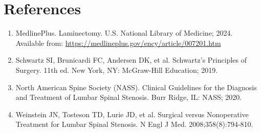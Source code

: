 \section*{References}
\begin{enumerate}
  \item MedlinePlus. Laminectomy. U.S. National Library of Medicine; 2024. Available from: \url{https://medlineplus.gov/ency/article/007201.htm}
  \item Schwartz SI, Brunicardi FC, Andersen DK, et al. Schwartz's Principles of Surgery. 11th ed. New York, NY: McGraw-Hill Education; 2019.
  \item North American Spine Society (NASS). Clinical Guidelines for the Diagnosis and Treatment of Lumbar Spinal Stenosis. Burr Ridge, IL: NASS; 2020.
  \item Weinstein JN, Tosteson TD, Lurie JD, et al. Surgical versus Nonoperative Treatment for Lumbar Spinal Stenosis. N Engl J Med. 2008;358(8):794-810.
\end{enumerate}

\clearpage
